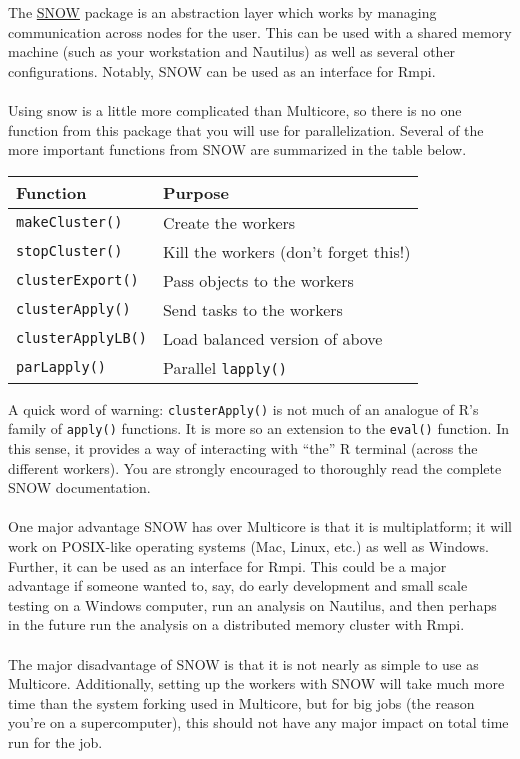 The \href{http://cran.r-project.org/web/packages/snow/index.html}{SNOW} package is an abstraction layer which works by managing communication across nodes for the user.  This can be used with a shared memory machine (such as your workstation and Nautilus) as well as several other configurations.  Notably, SNOW can be used as an interface for Rmpi.\\\\
%
Using snow is a little more complicated than Multicore, so there is no one function from this package that you will use for parallelization.  Several of the more important functions from SNOW are summarized in the table below.
\begin{table}[h]
 \centering
 \begin{tabular}{ll}\hline
  Function & Purpose\\\hline
  \texttt{makeCluster()} & Create the workers\\
  \texttt{stopCluster()} & Kill the workers (don't forget this!)\\
  \texttt{clusterExport()} & Pass objects to the workers\\
  \texttt{clusterApply()} & Send tasks to the workers\\
  \texttt{clusterApplyLB()} & Load balanced version of above\\
  \texttt{parLapply()} & Parallel \texttt{lapply()}\\\hline
 \end{tabular}
\end{table}
A quick word of warning:  \texttt{clusterApply()} is not much of an analogue of R's family of \texttt{apply()} functions.  It is more so an extension to the \texttt{eval()} function.  In this sense, it provides a way of interacting with ``the'' R terminal (across the different workers).  You are strongly encouraged to thoroughly read the complete SNOW documentation.\\\\
%
One major advantage SNOW has over Multicore is that it is multiplatform; it will work on POSIX-like operating systems (Mac, Linux, etc.) as well as Windows.  Further, it can be used as an interface for Rmpi.  This could be a major advantage if someone wanted to, say, do early development and small scale testing on a Windows computer, run an analysis on Nautilus, and then perhaps in the future run the analysis on a distributed memory cluster with Rmpi.\\\\
%
The major disadvantage of SNOW is that it is not nearly as simple to use as Multicore.  Additionally, setting up the workers with SNOW will take much more time than the system forking used in Multicore, but for big jobs (the reason you're on a supercomputer), this should not have any major impact on total time run for the job.

